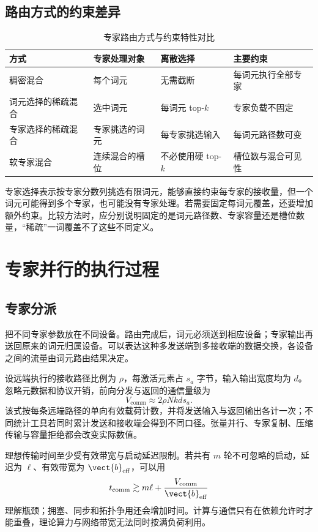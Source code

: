 \documentclass[../textbook.tex]{subfiles}
\begin{document}
\subsection{路由方式的约束差异}
\begin{table}[htbp]
\centering
\caption{专家路由方式与约束特性对比}\label{tab:moe-routing-modes}
\begin{tabularx}{\linewidth}{lXXX}
\toprule 方式 & 专家处理对象 & 离散选择 & 主要约束\\\midrule
稠密混合 & 每个词元 & 无需截断 & 每词元执行全部专家\\
词元选择的稀疏混合 & 选中词元 & 每词元 top-$k$ & 专家负载不固定\\
专家选择的稀疏混合 & 专家挑选的词元 & 每专家挑选输入 & 每词元路径数可变\\
软专家混合 & 连续混合的槽位 & 不必使用硬 top-$k$ & 槽位数与混合可见性\\
\bottomrule
\end{tabularx}
\end{table}
专家选择表示按专家分数列挑选有限词元，能够直接约束每专家的接收量，但一个词元可能得到多个专家，也可能没有专家处理。若需要固定每词元覆盖，还要增加额外约束。比较方法时，应分别说明固定的是词元路径数、专家容量还是槽位数量，“稀疏”一词覆盖不了这些不同定义。

\section{专家并行的执行过程}

\subsection{专家分派}
把不同专家参数放在不同设备。路由完成后，词元必须送到相应设备；专家输出再送回原来的词元归属设备。可以表达这种多发送端到多接收端的数据交换，各设备之间的流量由词元路由结果决定。

设远端执行的接收路径比例为 $\rho$，每激活元素占 $s_a$ 字节，输入输出宽度均为 $d$。忽略元数据和协议开销，前向分发与返回的通信量级为
\begin{equation}
 V_{\mathrm{comm}}\approx2\rho Nkd s_a.
\end{equation}
该式按每条远端路径的单向有效载荷计数，并将发送输入与返回输出各计一次；不同统计工具若同时累计发送和接收端会得到不同口径。张量并行、专家复制、压缩传输与容量拒绝都会改变实际数值。

理想传输时间至少受有效带宽与启动延迟限制。若共有 $m$ 轮不可忽略的启动，延迟为 $\ell$、有效带宽为 $\vect{b}_{\mathrm{eff}}$，可以用
\begin{equation}
 t_{\mathrm{comm}}\gtrsim m\ell+\frac{V_{\mathrm{comm}}}{\vect{b}_{\mathrm{eff}}}
\end{equation}
理解瓶颈；拥塞、同步和拓扑争用还会增加时间。计算与通信只有在依赖允许时才能重叠，理论算力与网络带宽无法同时按满负荷利用。
\end{document}

